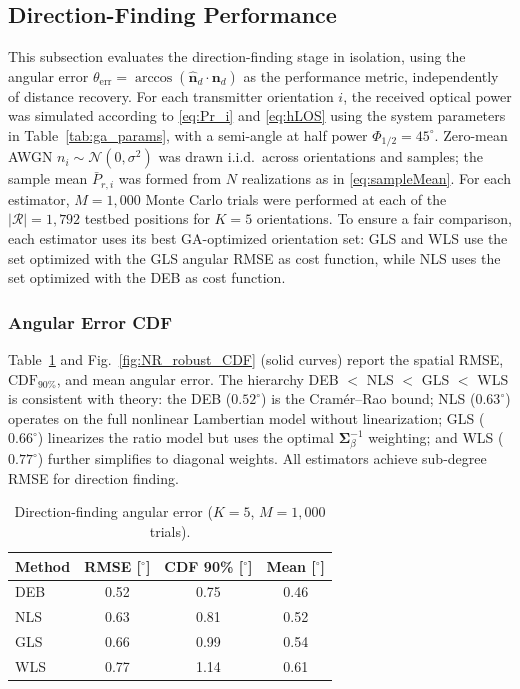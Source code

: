 \documentclass[journal]{IEEEtran}
\newcommand{\added}[1]{{\color{blue}#1}}
\begin{document}
\added{%
\subsection{Direction-Finding Performance}
\label{subsec:DF_performance}

This subsection evaluates the direction-finding stage in isolation, using the angular error $\theta_{\mathrm{err}} = \arccos(\hat{\mathbf{n}}_d\cdot\mathbf{n}_d)$ as the performance metric, independently of distance recovery. For each transmitter orientation $i$, the received optical power was simulated according to \eqref{eq:Pr_i} and \eqref{eq:hLOS} using the system parameters in Table~\ref{tab:ga_params}, with a semi-angle at half power $\Phi_{1/2}=45^\circ$. Zero-mean AWGN $n_i\!\sim\!\mathcal{N}(0,\sigma^2)$ was drawn i.i.d.\ across orientations and samples; the sample mean $\bar P_{r,i}$ was formed from $N$ realizations as in \eqref{eq:sampleMean}. For each estimator, $M=1{,}000$ Monte Carlo trials were performed at each of the $|\mathcal{R}|=1{,}792$ testbed positions for $K=5$ orientations. To ensure a fair comparison, each estimator uses its best GA-optimized orientation set: GLS and WLS use the set optimized with the GLS angular RMSE as cost function, while NLS uses the set optimized with the DEB as cost function.

\subsubsection{Angular Error CDF}

Table~\ref{tab:DF_performance} and Fig.~\ref{fig:NR_robust_CDF} (solid curves) report the spatial RMSE, $\mathrm{CDF}_{90\%}$, and mean angular error. The hierarchy DEB $<$ NLS $<$ GLS $<$ WLS is consistent with theory: the DEB ($0.52^\circ$) is the Cramér--Rao bound; NLS ($0.63^\circ$) operates on the full nonlinear Lambertian model without linearization; GLS ($0.66^\circ$) linearizes the ratio model but uses the optimal $\mathbf{\Sigma}_\beta^{-1}$ weighting; and WLS ($0.77^\circ$) further simplifies to diagonal weights. All estimators achieve sub-degree RMSE for direction finding.

\begin{table}[t]
\centering
\caption{Direction-finding angular error ($K=5$, $M=1{,}000$ trials).}
\label{tab:DF_performance}
\begin{tabular}{|l|c|c|c|}
\hline
\textbf{Method} & \textbf{RMSE [$^\circ$]} & \textbf{CDF 90\% [$^\circ$]} & \textbf{Mean [$^\circ$]} \\ \hline
DEB   & 0.52 & 0.75 & 0.46 \\ \hline
NLS   & 0.63 & 0.81 & 0.52 \\ \hline
GLS   & 0.66 & 0.99 & 0.54 \\ \hline
WLS   & 0.77 & 1.14 & 0.61 \\ \hline
\end{tabular}
\end{table}


}
\end{document}
